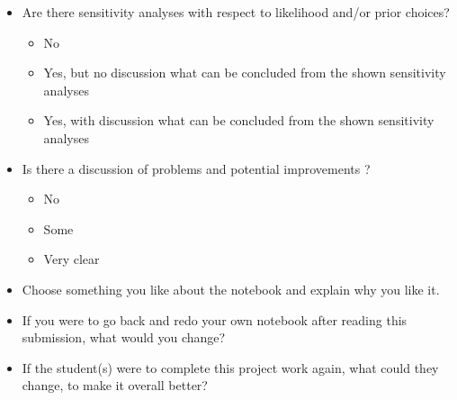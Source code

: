 \documentclass[a4paper,11pt]{article}
\begin{document}
\begin{itemize}
\item Are there sensitivity analyses with respect to likelihood and/or prior choices?
  \begin{itemize}
  \item No
  \item Yes, but no discussion what can be concluded from the shown sensitivity analyses
  \item Yes, with discussion what can be concluded from the shown sensitivity analyses
  \end{itemize}

\item Is there a discussion of problems and potential improvements ?
  \begin{itemize}
  \item No
  \item Some
  \item Very clear
  \end{itemize}

\item Choose something you like about the notebook and explain why you like it. 

\item If you were to go back and redo your own notebook after reading this submission, what would you change?

\item If the student(s) were to complete this project work again, what could they change, to make it overall better?
\end{itemize}
\end{document}
